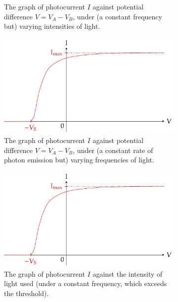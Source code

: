 \documentclass[oneside]{book}
\begin{document}
\begin{figure}[H]
\begin{subfigure}[c]{0.49\textwidth}
        \caption{ The graph of photocurrent \(I\) against potential difference \(V=V_A-V_B\), under (a constant frequency but) varying intensities of light.}
    \end{subfigure}\hfill
    \begin{subfigure}[c]{0.49\textwidth}
        \centering
        \includegraphics[width=\textwidth,page=5]{../images/The-Photoelectric-Effect/The-Photoelectric-Effect.pdf}
        \caption{ The graph of photocurrent \(I\) against potential difference \(V=V_A-V_B\), under (a constant rate of photon emission but) varying frequencies of light.}
    \end{subfigure}\hfill
    \begin{subfigure}[c]{0.49\textwidth}
        \centering
        \includegraphics[width=\textwidth,page=6]{../images/The-Photoelectric-Effect/The-Photoelectric-Effect.pdf}
        \caption{The graph of photocurrent \(I\) against the intensity of light used (under a constant frequency, which exceeds the threshold).}
    \end{subfigure}\hfill
    \begin{subfigure}[c]{0.49\textwidth}

\end{subfigure}
\end{figure}
\end{document}
